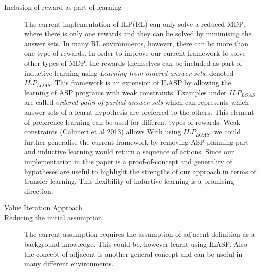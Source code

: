 \begin{description}
    \item[Inclusion of reward as part of learning]
    The current implementation of ILP(RL) can only solve a reduced MDP, where there is only one rewards and they can be solved by minimising the answer sets.
    In many RL environments, however, there can be more than one type of rewards. In order to improve our current framework to solve other types of MDP, 
    the rewards themselves can be included as part of inductive learning using \textit{Learning from ordered answer sets}, denoted $ILP_{LOAS}$. 
    This framework is an extension of ILASP by allowing the learning of ASP programs with weak constraints.
    Examples under $ILP_{LOAS}$ are called \textit{ordered pairs of partial answer sets} which can represents which answer sets of a learnt hypothesis are preferred to the others.
    This element of preference learning can be used for different types of rewards. 
    Weak constraints (Calimeri et al 2013) allows 
    With using $ILP_{LOAS}$, we could further generalise the current framework by removing ASP planning part and inductive learning would return a sequence of actions. 
    Since our implementation in this paper is a proof-of-concept and generality of hypotheses are useful to highlight the strengths of our approach in terms of transfer learning.
    This flexibility of inductive learning is a promising direction.
    \item[Value Iteration Approach]
    \item[Reducing the initial assumption]
    The current assumption requires the assumption of adjacent definition as a background knowledge. This could be, however learnt using ILASP.
    Also the concept of adjacent is another general concept and can be useful in many different environments.
\end{description}

